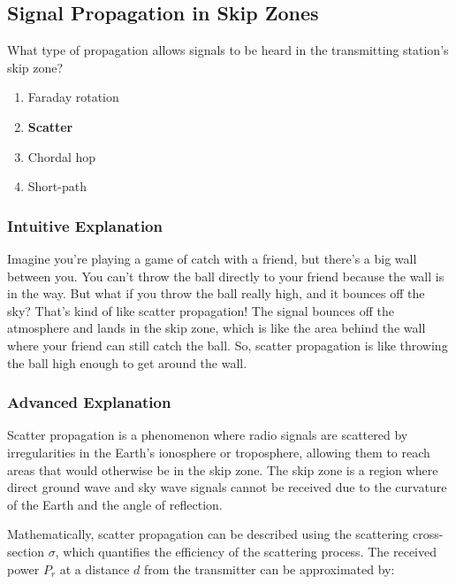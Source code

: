 \subsection{Signal Propagation in Skip Zones}
\label{G3C09}

\begin{tcolorbox}[colback=gray!10!white,colframe=black!75!black,title=G3C09]
What type of propagation allows signals to be heard in the transmitting station’s skip zone?
\begin{enumerate}[label=\Alph*),noitemsep]
    \item Faraday rotation
    \item \textbf{Scatter}
    \item Chordal hop
    \item Short-path
\end{enumerate}
\end{tcolorbox}

\subsubsection{Intuitive Explanation}
Imagine you're playing a game of catch with a friend, but there's a big wall between you. You can't throw the ball directly to your friend because the wall is in the way. But what if you throw the ball really high, and it bounces off the sky? That's kind of like scatter propagation! The signal bounces off the atmosphere and lands in the skip zone, which is like the area behind the wall where your friend can still catch the ball. So, scatter propagation is like throwing the ball high enough to get around the wall.

\subsubsection{Advanced Explanation}
Scatter propagation is a phenomenon where radio signals are scattered by irregularities in the Earth's ionosphere or troposphere, allowing them to reach areas that would otherwise be in the skip zone. The skip zone is a region where direct ground wave and sky wave signals cannot be received due to the curvature of the Earth and the angle of reflection.

Mathematically, scatter propagation can be described using the scattering cross-section \(\sigma\), which quantifies the efficiency of the scattering process. The received power \(P_r\) at a distance \(d\) from the transmitter can be approximated by:

